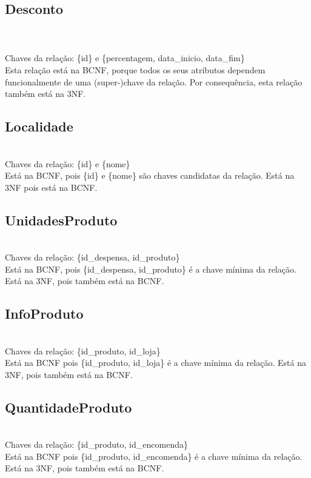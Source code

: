 \documentclass{report}
\begin{document}
\subsection{Desconto}
\\
\\
\newline
Chaves da relação: \{id\} e \{percentagem, data\_inicio, data\_fim\}\\
Esta relação está na BCNF, porque todos os seus atributos dependem funcionalmente
de uma (super-)chave da relação. Por consequência, esta relação também
está na 3NF.

\subsection{Localidade}
\\
\newline
Chaves da relação: \{id\} e \{nome\}\\
Está na BCNF, pois \{id\} e \{nome\} são chaves candidatas da relação. Está
na 3NF pois está na BCNF.

\subsection{UnidadesProduto}
\\
\newline
Chaves da relação: \{id\_despensa, id\_produto\}\\
Está na BCNF, pois \{id\_despensa, id\_produto\} é a chave mínima da relação.
Está na 3NF, pois também está na BCNF.

\subsection{InfoProduto}
\\
\newline
Chaves da relação: \{id\_produto, id\_loja\}\\
Está na BCNF pois \{id\_produto, id\_loja\} é a chave mínima da relação. Está
na 3NF, pois também está na BCNF.\\

\subsection{QuantidadeProduto}
\\
\newline
Chaves da relação: \{id\_produto, id\_encomenda\}\\
Está na BCNF pois \{id\_produto, id\_encomenda\} é a chave mínima da relação. Está
na 3NF, pois também está na BCNF.\\
\end{document}
